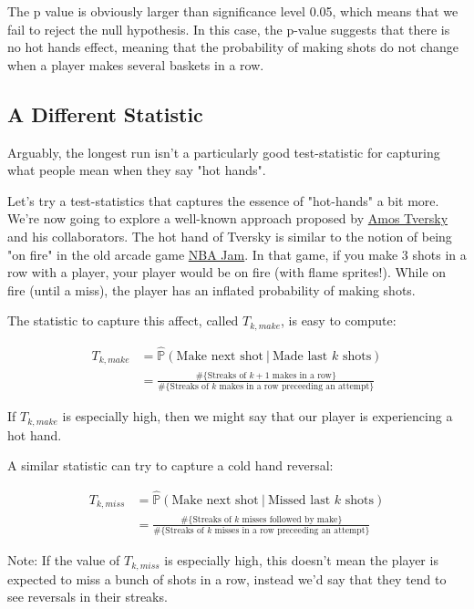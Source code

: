 \documentclass[11pt]{article}
\begin{document}
    The p value is obviously larger than significance level 0.05, which
means that we fail to reject the null hypothesis. In this case, the
p-value suggests that there is no hot hands effect, meaning that the
probability of making shots do not change when a player makes several
baskets in a row.

    \subsection{A Different Statistic}\label{a-different-statistic}

Arguably, the longest run isn't a particularly good test-statistic for
capturing what people mean when they say "hot hands".

Let's try a test-statistics that captures the essence of "hot-hands" a
bit more. We're now going to explore a well-known approach proposed by
\href{https://en.wikipedia.org/wiki/Amos_Tversky}{Amos Tversky} and his
collaborators. The hot hand of Tversky is similar to the notion of being
"on fire" in the old arcade game
\href{https://www.youtube.com/watch?v=ipzstdPtxNw}{NBA Jam}. In that
game, if you make 3 shots in a row with a player, your player would be
on fire (with flame sprites!). While on fire (until a miss), the player
has an inflated probability of making shots.

The statistic to capture this affect, called \(T_{k, make}\), is easy to
compute:

\begin{align*}
  T_{k, make}
  & = \hat{\mathbb{P}}(\text{Make next shot}\ \vert\ \text{Made last $k$ shots})\\
  & = \frac{\#\{\text{Streaks of $k+1$ makes in a row}\}}{\#\{\text{Streaks of $k$ makes in a row preceeding an attempt}\}}
\end{align*}

If \(T_{k, make}\) is especially high, then we might say that our player
is experiencing a hot hand.

A similar statistic can try to capture a cold hand reversal:

\begin{align*}
  T_{k, miss}
  & = \hat{\mathbb{P}}(\text{Make next shot}\ \vert\ \text{Missed last $k$ shots})\\
  & = \frac{\#\{\text{Streaks of $k$ misses followed by make}\}}{\#\{\text{Streaks of $k$ misses in a row preceeding an attempt}\}}
\end{align*}

Note: If the value of \(T_{k, miss}\) is especially high, this doesn't
mean the player is expected to miss a bunch of shots in a row, instead
we'd say that they tend to see reversals in their streaks.
\end{document}
